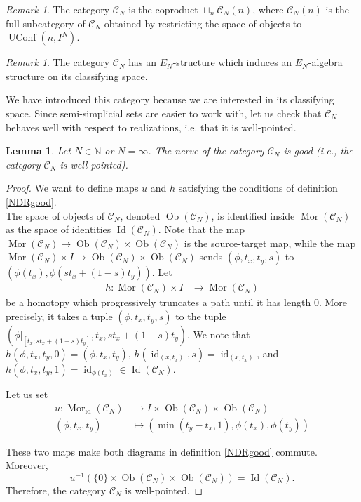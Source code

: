 \documentclass[12pt]{amsart}
\theoremstyle{plain}
\newtheorem{lem}[teo]{Lemma}
\theoremstyle{definition}
\theoremstyle{remark}
\newtheorem{rema}[teo]{Remark}
\DeclareMathOperator{\UConf}{UConf}
\DeclareMathOperator{\id}{id}
\DeclareMathOperator{\Id}{Id}
\DeclareMathOperator{\Mor}{Mor}
\DeclareMathOperator{\Ob}{Ob}
\newcommand{\C}{\mathcal{C}}
\begin{document}
\begin{rema}
    The category $\C_N$ is the coproduct $\displaystyle \sqcup_{n} \C_N(n)$, where $\C_N(n)$ is the full subcategory of $\C_N$ obtained by restricting the space of objects to $\UConf(n,I^N)$.
\end{rema}

\begin{rema}
    The category $\C_N$ has an $E_N$-structure which induces an $E_N$-algebra structure on its classifying space.
\end{rema}

We have introduced this category because we are interested in its classifying space. 
Since semi-simplicial sets are easier to work with, let us check that $\C_N$ behaves well with respect to realizations, i.e. that it is well-pointed.

\begin{lem}\label{goodnerve}
Let $N\in\mathbb{N}$ or $N=\infty$. The nerve of the category $\C_N$ is good (i.e., the category $\C_N$ is well-pointed).
\end{lem}

\begin{proof}
We want to define maps $u$ and $h$ satisfying the conditions of definition \ref{NDRgood}.\\
The space of objects of $\C_N$, denoted $\Ob(\C_N)$, is identified inside $\Mor(\C_N)$ as the space of identities $\Id(\C_N)$. 
Note that the map $\Mor(\C_N)\rightarrow \Ob(\C_N)\times\Ob(\C_N)$ is the source-target map, 
while the map $\Mor(\C_N)\times I\rightarrow \Ob(\C_N)\times\Ob(\C_N)$ sends $(\phi,t_x,t_y,s)$ to $(\phi(t_x),\phi(st_x+(1-s)t_y))$.
Let 
\begin{align*}
h: \Mor(\C_N)\times I &\longrightarrow \Mor(\C_N)
\end{align*}
be a homotopy which progressively truncates a path until it has length 0.
More precisely, it takes a tuple $(\phi, t_x, t_y, s)$ to the tuple $(\phi\vert_{[t_x; st_x+(1-s)t_y]},t_x,st_x+(1-s)t_y)$.
We note that $h(\phi, t_x,t_y, 0) = (\phi,t_x,t_y)$, $h(\id_{(x,t_x)},s) = \id_{(x,t_x)}$, and $h(\phi, t_x, t_y, 1) = \id_{\phi(t_x)} \in\Id(\C_N)$.

Let us set
\begin{align*}
    u: \Mor_{\id}(\C_N) &\longrightarrow I\times \Ob(\C_N)\times\Ob(\C_N)\\
    (\phi,t_x,t_y) &\longmapsto \left(\min(t_y-t_x,1),\phi(t_x), \phi(t_y)\right)
\end{align*}

These two maps make both diagrams in definition \ref{NDRgood} commute. 
Moreover,
\[u^{-1}(\{0\}\times \Ob(\C_N)\times \Ob(\C_N)) = \Id(\C_N).\]
Therefore, the category $\C_N$ is well-pointed.
\end{proof}
\end{document}
